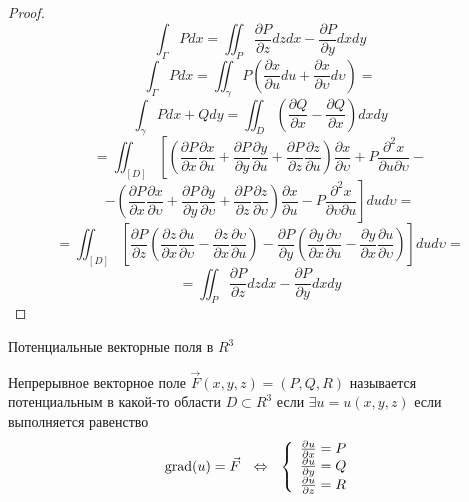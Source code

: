 \begin{proof}
  $$
  \int_{\Gamma} P dx = \iint_P
    \frac{\partial P}{\partial z} dz dx
    -
    \frac{\partial P}{\partial y} dx dy
  $$
  $$
  \int_{\Gamma} P dx = \iint_{\gamma}
    P
    \left(
      \frac{\partial x}{\partial u} du
      +
      \frac{\partial x}{\partial \upsilon} d\upsilon
    \right)
  =
  $$
  $$
  \int_{\gamma} Pdx + Qdy = \iint_D
    \left(
      \frac{\partial Q}{\partial x}
      -
      \frac{\partial Q}{\partial x}
    \right)
    dx dy
  $$
  $$
  = \iint_{[D]}
    \left[
      \left(
        \frac{\partial P}{\partial x}
        \frac{\partial x}{\partial u}
        +
        \frac{\partial P}{\partial y}
        \frac{\partial y}{\partial u}
        +
        \frac{\partial P}{\partial z}
        \frac{\partial z}{\partial u}
      \right)
      \frac{\partial x}{\partial \upsilon}
      +
      P \frac{\partial^2 x}{\partial u \partial \upsilon}
    \right.
    -
  $$
  $$
    \left.
      -
      \left(
        \frac{\partial P}{\partial x}
        \frac{\partial x}{\partial \upsilon}
        +
        \frac{\partial P}{\partial y}
        \frac{\partial y}{\partial \upsilon}
        +
        \frac{\partial P}{\partial z}
        \frac{\partial z}{\partial \upsilon}
      \right)
      \frac{\partial x}{\partial u}
      -
      P \frac{\partial^2 x}{\partial \upsilon \partial u}
    \right]
    du d\upsilon
  =
  $$
  $$
  = \iint_{[D]}
    \left[
      \frac{\partial P}{\partial z}
      \left(
        \frac{\partial z}{\partial x}
        \frac{\partial u}{\partial \upsilon}
        -
        \frac{\partial z}{\partial x}
        \frac{\partial \upsilon}{\partial u}
      \right)
      -
      \frac{\partial P}{\partial y}
      \left(
        \frac{\partial y}{\partial x}
        \frac{\partial \upsilon}{\partial u}
        -
        \frac{\partial y}{\partial x}
        \frac{\partial u}{\partial \upsilon}
      \right)
    \right]
    du d\upsilon =
  $$
  $$
  = \iint_P
    \frac{\partial P}{\partial z} dz dx
    -
    \frac{\partial P}{\partial y} dx dy
  $$
\end{proof}

\begin{title}[\Large]
  Потенциальные векторные поля в $R^3$
\end{title}

\begin{define}
  Непрерывное векторное поле $\vec F(x,y,z) = (P, Q, R)$ называется
  потенциальным в какой-то области $D \subset R^3$ если $\exists u = u(x,y,z)$
  если выполняется равенство
  $$
  \mathrm{grad} (u) = \vec F ~~ \Leftrightarrow ~~
  \left\{
  \begin{array}{l}
    \frac{\partial u}{\partial x} = P \\
    \frac{\partial u}{\partial y} = Q \\
    \frac{\partial u}{\partial z} = R
  \end{array}
  \right.
  $$
\end{define}

